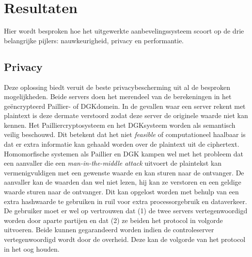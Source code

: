 \section{Resultaten}
Hier wordt besproken hoe het uitgewerkte aanbevelingssysteem scoort op de drie belangrijke pijlers: nauwkeurigheid, privacy en performantie.
\subsection{Privacy}
Deze oplossing biedt veruit de beste privacybescherming uit al de besproken mogelijkheden. Beide servers doen het merendeel van de berekeningen in het ge\"encrypteerd Paillier- of DGKdomein. In de gevallen waar een server rekent met plaintext is deze dermate verstoord zodat deze server de originele waarde niet kan kennen. Het Pailliercryptosysteem en het DGKsysteem worden als semantisch veilig beschouwd. Dit betekent dat het niet \emph{feasible} of computationeel haalbaar is dat er extra informatie kan gehaald worden over de plaintext uit de ciphertext. Homomorfische systemen als Paillier en DGK kampen wel met het probleem dat een aanvaller die een \emph{man-in-the-middle attack} uitvoert de plaintekst kan vermenigvuldigen met een gewenste waarde en kan sturen naar de ontvanger. De aanvaller kan de waarden dan wel niet lezen, hij kan ze verstoren en een geldige waarde sturen naar de ontvanger. Dit kan opgelost worden met behulp van een extra hashwaarde te gebruiken \cite{yi:homomorphic} in ruil voor extra processorgebruik en dataverkeer. De gebruiker moet er wel op vertrouwen dat (1) de twee servers vertegenwoordigd worden door aparte partijen en dat (2) ze beiden het protocol in volgorde uitvoeren. Beide kunnen gegarandeerd worden indien de controleserver vertegenwoordigd wordt door de overheid. Deze kan de volgorde van het protocol in het oog houden.
